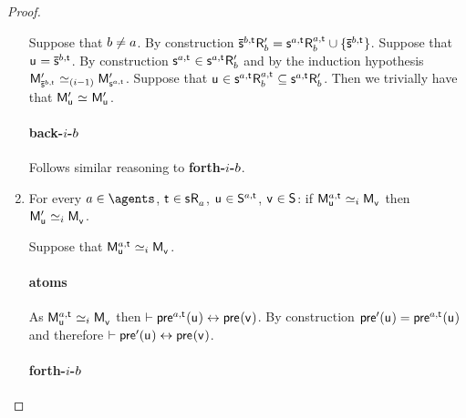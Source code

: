 \begin{proof}
\begin{enumerate}
            Suppose that $b \neq a$.
            By construction $\aPStateS[\agentB,\aStateT] \aAccessibility[\prime]{\agentB} = \aStateS[\agentA,\aStateT] \aAccessibility[\agentA,\aStateT]{\agentB} \cup \{\aPStateS[\agentB,\aStateT]\}$. 
            Suppose that $\aStateU = \aPStateS[\agentB,\aStateT]$.
            By construction $\aStateS[\agentA,\aStateT] \in \aStateS[\agentA,\aStateT] \aAccessibility[\prime]{\agentB}$ and by the induction hypothesis $\aPModel[\prime]{\aPStateS[\agentB,\aStateT]} \bisimilar[(i - 1)] \aPModel[\prime]{\aStateS[\agentA,\aStateT]}$.
            Suppose that $\aStateU \in \aStateS[\agentA,\aStateT] \aAccessibility[\agentA,\aStateT]{\agentB} \subseteq \aStateS[\agentA,\aStateT] \aAccessibility[\prime]{\agentB}$.
            Then we trivially have that $\aPModel[\prime]{\aStateU} \bisimilar \aPModel[\prime]{\aStateU}$.

            \paragraph{back-$i$-$b$} Follows similar reasoning to {\bf forth-$i$-$b$}.

        \item 
            For every $\agentA \in \agents$, $\aStateT \in \aStateS \aAccessibility{\agentA}$, $\aStateU \in \aStates[\agentA,\aStateT]$, $\aStateV \in \aStates$: if $\aPModel[\agentA,\aStateT]{\aStateU} \bisimilar[i] \aPModel{\aStateV}$ then $\aPModel[\prime]{\aStateU} \bisimilar[i] \aPModel{\aStateV}$.

            Suppose that $\aPModel[\agentA,\aStateT]{\aStateU} \bisimilar[i] \aPModel{\aStateV}$. 

            \paragraph{atoms}

            As $\aPModel[\agentA,\aStateT]{\aStateU} \bisimilar[i] \aPModel{\aStateV}$ then $\proves \aPrecondition[\agentA,\aStateT](\aStateU) \iff \aPrecondition(\aStateV)$. 
            By construction $\aPrecondition[\prime](\aStateU) = \aPrecondition[\agentA,\aStateT](\aStateU)$ and therefore $\proves \aPrecondition[\prime](\aStateU) \iff \aPrecondition(\aStateV)$.

            \paragraph{forth-$i$-$b$}


\end{enumerate}
\end{proof}
